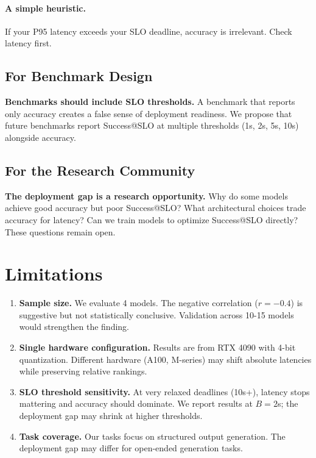 \documentclass[11pt]{article}
\begin{document}
\paragraph{A simple heuristic.}
If your P95 latency exceeds your SLO deadline, accuracy is irrelevant.
Check latency first.

\subsection{For Benchmark Design}

\textbf{Benchmarks should include SLO thresholds.}
A benchmark that reports only accuracy creates a false sense of deployment readiness.
We propose that future benchmarks report Success@SLO at multiple thresholds (1s, 2s, 5s, 10s) alongside accuracy.

\subsection{For the Research Community}

\textbf{The deployment gap is a research opportunity.}
Why do some models achieve good accuracy but poor Success@SLO?
What architectural choices trade accuracy for latency?
Can we train models to optimize Success@SLO directly?
These questions remain open.

\section{Limitations}

\begin{enumerate}[leftmargin=12pt]
    \item \textbf{Sample size.} We evaluate 4 models. The negative correlation ($r = -0.4$) is suggestive but not statistically conclusive. Validation across 10-15 models would strengthen the finding.

    \item \textbf{Single hardware configuration.} Results are from RTX 4090 with 4-bit quantization. Different hardware (A100, M-series) may shift absolute latencies while preserving relative rankings.

    \item \textbf{SLO threshold sensitivity.} At very relaxed deadlines (10s+), latency stops mattering and accuracy should dominate. We report results at $B = 2$s; the deployment gap may shrink at higher thresholds.

    \item \textbf{Task coverage.} Our tasks focus on structured output generation. The deployment gap may differ for open-ended generation tasks.
\end{enumerate}
\end{document}
